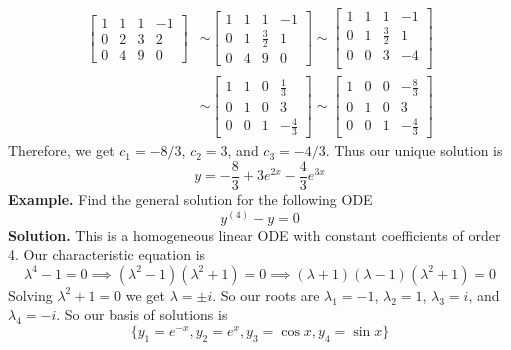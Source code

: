 \documentclass[openany]{report}
\begin{document}
\begin{align*}
    \left[
        \begin{array}{ccc|c}
            1 & 1 & 1 & -1\\
            0 & 2 & 3 & 2\\
            0 & 4 & 9 & 0
        \end{array}  
    \right] &\sim \left[
        \begin{array}{ccc|c}
            1 & 1 & 1 & -1\\
            0 & 1 & \frac{3}{2} & 1\\
            0 & 4 & 9 & 0
        \end{array}
        \right] \sim \left[
            \begin{array}{ccc|c}
                1 & 1 & 1 & -1\\
                0 & 1 & \frac{3}{2} & 1\\
                0 & 0 & 3 & -4\\
            \end{array}
        \right]\\
        &\sim \left[
            \begin{array}{ccc|c}
                1 & 1 & 0 & \frac{1}{3}\\
                0 & 1 & 0 & 3\\
                0 & 0 & 1 & -\frac{4}{3}
            \end{array}
        \right] \sim \left[
            \begin{array}{ccc|c}
                1 & 0 & 0 & -\frac{8}{3}\\
                0 & 1 & 0 & 3\\
                0 & 0 & 1 & -\frac{4}{3}
            \end{array}
        \right]
    \end{align*}
    Therefore, we get $c_1 = -8/3$, $c_2 = 3$, and $c_3 = -4/3$. Thus our unique solution is 
    \[y = -\frac{8}{3} + 3e^{2x} - \frac{4}{3}e^{3x}\]
    \textbf{Example.} Find the general solution for the following ODE 
    \[y^{(4)} - y = 0\]
    \textbf{Solution.} This is a homogeneous linear ODE with constant coefficients of order 4. Our characteristic equation is
    \[\lambda^4 - 1 = 0 \implies (\lambda^2 - 1)(\lambda^2 + 1) = 0 \implies (\lambda + 1)(\lambda - 1)(\lambda^2 + 1) = 0\]
    Solving $\lambda^2 + 1 = 0$ we get $\lambda = \pm i$. So our roots are $\lambda_1 = -1$, $\lambda_2 = 1$, $\lambda_3 = i$, and $\lambda_4 = -i$. So our basis of solutions is
    \[\{y_1 = e^{-x}, y_2 = e^{x}, y_3 = \cos x, y_4 = \sin x\}\]
\end{document}
